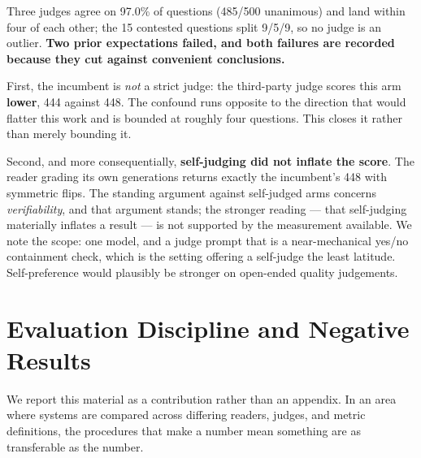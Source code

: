 \begin{table}[!htbp]
\centering
\caption{Judge panel over identical hypotheses. The self-judge cell is run deliberately.}
\label{tab:judges}
\end{table}

Three judges agree on 97.0\% of questions (485/500 unanimous) and land within four of each other; the 15 contested questions split 9/5/9, so no judge is an outlier. \textbf{Two prior expectations failed, and both failures are recorded because they cut against convenient conclusions.}

First, the incumbent is \emph{not} a strict judge: the third-party judge scores this arm \textbf{lower}, 444 against 448. The confound runs opposite to the direction that would flatter this work and is bounded at roughly four questions. This closes it rather than merely bounding it.

Second, and more consequentially, \textbf{self-judging did not inflate the score}. The reader grading its own generations returns exactly the incumbent's 448 with symmetric flips. The standing argument against self-judged arms concerns \emph{verifiability}, and that argument stands; the stronger reading --- that self-judging materially inflates a result --- is not supported by the measurement available. We note the scope: one model, and a judge prompt that is a near-mechanical yes/no containment check, which is the setting offering a self-judge the least latitude. Self-preference would plausibly be stronger on open-ended quality judgements.

\section{Evaluation Discipline and Negative Results}
\label{sec:discipline}

We report this material as a contribution rather than an appendix. In an area where systems are compared across differing readers, judges, and metric definitions, the procedures that make a number mean something are as transferable as the number.

